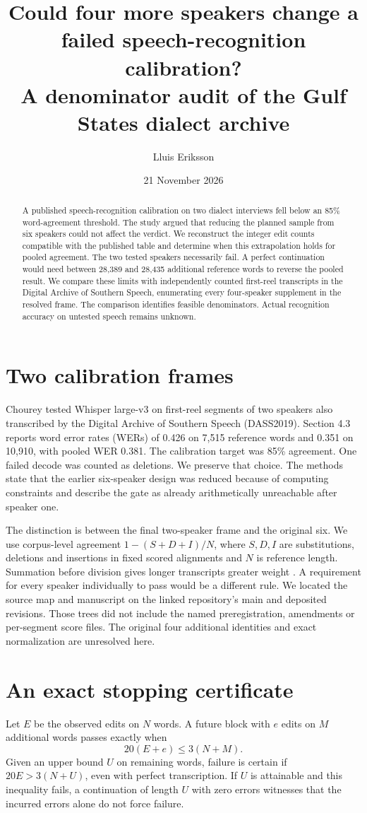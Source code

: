 \documentclass[11pt]{article}
\title{Could four more speakers change a failed speech-recognition calibration?\\A denominator audit of the Gulf States dialect archive}
\author{Lluis Eriksson}\date{21 November 2026}
\begin{document}
\maketitle
\begin{abstract}
A published speech-recognition calibration on two dialect interviews fell below an 85\% word-agreement threshold. The study argued that reducing the planned sample from six speakers could not affect the verdict. We reconstruct the integer edit counts compatible with the published table and determine when this extrapolation holds for pooled agreement. The two tested speakers necessarily fail. A perfect continuation would need between 28,389 and 28,435 additional reference words to reverse the pooled result. We compare these limits with independently counted first-reel transcripts in the Digital Archive of Southern Speech, enumerating every four-speaker supplement in the resolved frame. The comparison identifies feasible denominators. Actual recognition accuracy on untested speech remains unknown.
\end{abstract}
\section{Two calibration frames}
Chourey \cite{audit} tested Whisper large-v3 on first-reel segments of two speakers also transcribed by the Digital Archive of Southern Speech (DASS2019). Section 4.3 reports word error rates (WERs) of 0.426 on 7,515 reference words and 0.351 on 10,910, with pooled WER 0.381. The calibration target was 85\% agreement. One failed decode was counted as deletions. We preserve that choice. The methods state that the earlier six-speaker design was reduced because of computing constraints and describe the gate as already arithmetically unreachable after speaker one.

The distinction is between the final two-speaker frame and the original six. We use corpus-level agreement $1-(S+D+I)/N$, where $S,D,I$ are substitutions, deletions and insertions in fixed scored alignments and $N$ is reference length. Summation before division gives longer transcripts greater weight \cite{sampling}. A requirement for every speaker individually to pass would be a different rule. We located the source map and manuscript on the linked repository's main and deposited revisions. Those trees did not include the named preregistration, amendments or per-segment score files. The original four additional identities and exact normalization are unresolved here.
\section{An exact stopping certificate}
Let $E$ be the observed edits on $N$ words. A future block with $e$ edits on $M$ additional words passes exactly when
\[
20(E+e)\leq3(N+M).
\]
Given an upper bound $U$ on remaining words, failure is certain if $20E>3(N+U)$, even with perfect transcription. If $U$ is attainable and this inequality fails, a continuation of length $U$ with zero errors witnesses that the incurred errors alone do not force failure.
\end{document}
